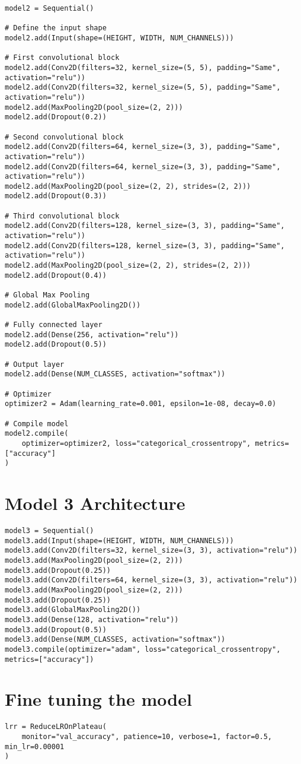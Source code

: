\begin{verbatim}
model2 = Sequential()

# Define the input shape
model2.add(Input(shape=(HEIGHT, WIDTH, NUM_CHANNELS)))

# First convolutional block
model2.add(Conv2D(filters=32, kernel_size=(5, 5), padding="Same", activation="relu"))
model2.add(Conv2D(filters=32, kernel_size=(5, 5), padding="Same", activation="relu"))
model2.add(MaxPooling2D(pool_size=(2, 2)))
model2.add(Dropout(0.2))

# Second convolutional block
model2.add(Conv2D(filters=64, kernel_size=(3, 3), padding="Same", activation="relu"))
model2.add(Conv2D(filters=64, kernel_size=(3, 3), padding="Same", activation="relu"))
model2.add(MaxPooling2D(pool_size=(2, 2), strides=(2, 2)))
model2.add(Dropout(0.3))

# Third convolutional block
model2.add(Conv2D(filters=128, kernel_size=(3, 3), padding="Same", activation="relu"))
model2.add(Conv2D(filters=128, kernel_size=(3, 3), padding="Same", activation="relu"))
model2.add(MaxPooling2D(pool_size=(2, 2), strides=(2, 2)))
model2.add(Dropout(0.4))

# Global Max Pooling
model2.add(GlobalMaxPooling2D())

# Fully connected layer
model2.add(Dense(256, activation="relu"))
model2.add(Dropout(0.5))

# Output layer
model2.add(Dense(NUM_CLASSES, activation="softmax"))

# Optimizer
optimizer2 = Adam(learning_rate=0.001, epsilon=1e-08, decay=0.0)

# Compile model
model2.compile(
    optimizer=optimizer2, loss="categorical_crossentropy", metrics=["accuracy"]
)
\end{verbatim}

\section{Model 3 Architecture}
\label{app:app-A section4}
\begin{verbatim}
model3 = Sequential()
model3.add(Input(shape=(HEIGHT, WIDTH, NUM_CHANNELS)))
model3.add(Conv2D(filters=32, kernel_size=(3, 3), activation="relu"))
model3.add(MaxPooling2D(pool_size=(2, 2)))
model3.add(Dropout(0.25))
model3.add(Conv2D(filters=64, kernel_size=(3, 3), activation="relu"))
model3.add(MaxPooling2D(pool_size=(2, 2)))
model3.add(Dropout(0.25))
model3.add(GlobalMaxPooling2D())
model3.add(Dense(128, activation="relu"))
model3.add(Dropout(0.5))
model3.add(Dense(NUM_CLASSES, activation="softmax"))
model3.compile(optimizer="adam", loss="categorical_crossentropy", metrics=["accuracy"])
\end{verbatim}

\section{Fine tuning the model}
\label{app:app-A section5}

\begin{verbatim}
lrr = ReduceLROnPlateau(
    monitor="val_accuracy", patience=10, verbose=1, factor=0.5, min_lr=0.00001
)
\end{verbatim}